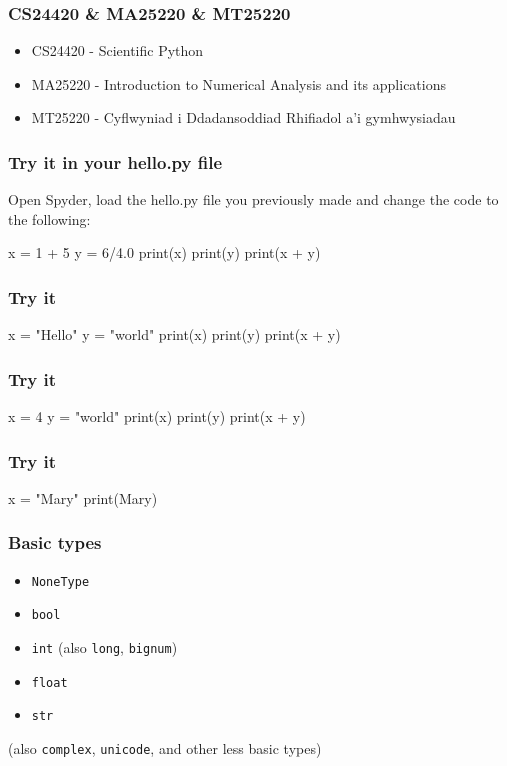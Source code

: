 \documentclass{beamer}
\begin{document}

\begin{frame}
\frametitle{CS24420 \& MA25220 \& MT25220}
\begin{itemize}
\item CS24420 - Scientific Python
\item MA25220 - Introduction to Numerical Analysis and its
  applications
\item MT25220 - Cyflwyniad i Ddadansoddiad Rhifiadol a'i gymhwysiadau
\end{itemize}
\end{frame}


\begin{frame}[fragile]
\frametitle{Try it in your hello.py file}
Open Spyder, load the hello.py file you previously made and change the
code to the following:
\begin{code}
x = 1 + 5
y = 6/4.0
print(x)
print(y)
print(x + y)
\end{code}
\end{frame}

\begin{frame}[fragile]
\frametitle{Try it}
\begin{code}
x = "Hello"
y = "world"
print(x)
print(y)
print(x + y)
\end{code}
\end{frame}


\begin{frame}[fragile]
\frametitle{Try it}
\begin{code}
x = 4
y = "world"
print(x)
print(y)
print(x + y)
\end{code}
\end{frame}

\begin{frame}[fragile]
\frametitle{Try it}
\begin{code}
x = "Mary"
print(Mary)
\end{code}
\end{frame}



\begin{frame}
\frametitle{Basic types}
\begin{itemize}
\item {\tt NoneType}
\item {\tt bool}
\item {\tt int} (also {\tt long}, {\tt bignum})
\item {\tt float}
\item {\tt str} 
\end{itemize}
(also {\tt complex}, {\tt unicode}, and other less basic types)
\end{frame}
\end{document}
